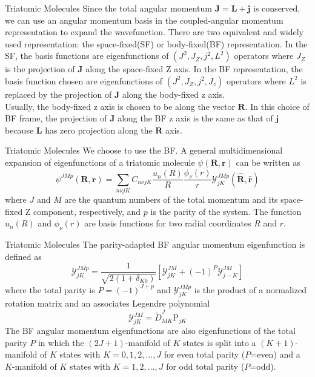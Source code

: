 \documentclass{beamer}
\begin{document}
	\begin{frame}{Triatomic Molecules}
		Since the total angular momentum $\mathbf{J}=\mathbf{L}+\mathbf{j}$ is conserved, we can use an angular momentum basis in the coupled-angular momentum representation to expand the wavefunction. There are two equivalent and widely used representation: the space-fixed(SF) or body-fixed(BF) representation. In the SF, the basis functions are eigenfunctions of $(J^2,J_Z,j^2,L^2)$ operators where $J_Z$ is the projection of $\mathbf{J}$ along the space-fixed Z axis. In the BF representation, the basis function chosen are eigenfunctions of $(J^2,J_Z,j^2,J_z)$ operators where $L^2$ is replaced by the projection of $\mathbf{J}$ along the body-fixed z axis.\\
		Usually, the body-fixed z axis is chosen to be along the vector $\mathbf{R}$. In this choice of BF frame, the projection of $\mathbf{J}$ along the BF z axis is the same as that of $\mathbf{j}$ because $\mathbf{L}$ has zero projection along the $\mathbf{R}$ axis.
	\end{frame}
	\begin{frame}{Triatomic Molecules}
		We choose to use the BF. A general multidimensional expansion of eigenfunctions of a triatomic molecule $\psi(\mathbf{R},\mathbf{r})$ can be written as
		\begin{equation}
			\psi^{JMp}(\mathbf{R},\mathbf{r})=\sum\limits_{n\nu jK}C_{n\nu jK}\dfrac{u_n(R)}{R}\dfrac{\phi_\nu(r)}{r}\mathcal{Y}^{JMp}_{jK}(\hat{\mathbf{R}},\hat{\mathbf{r}})
		\end{equation}
		where $J$ and $M$ are the quantum numbers of the total momentum and its space-fixed Z component, respectively, and $p$ is the parity of the system. The function $u_n(R)$ and $\phi_\nu(r)$ are basis functions for two radial coordinates $R$ and $r$. 
	\end{frame}
	\begin{frame}{Triatomic Molecules}
		The parity-adapted BF angular momentum eigenfunction is defined as
		\begin{equation}
			\mathcal{Y}^{JMp}_{jK}=\dfrac{1}{\sqrt{2(1+\delta_{K0})}}[\mathcal{Y}^{JM}_{jK}+(-1)^P\mathcal{Y}^{JM}_{j-K}]
		\end{equation}
		where the total parity is $P=(-1)^{J+p}$ and $\mathcal{Y}^{JMp}_{jK}$ is the product of a normalized rotation matrix and an associates Legendre polynomial
		\begin{equation}
			\mathcal{Y}^{JM}_{jK}=\tilde{D}^J_{MK}\mathrm{P}_{jK}
		\end{equation}
		The BF angular momentum eigenfunctions are also eigenfunctions of the total parity $P$ in which the $(2J+1)$-manifold of $K$ states is split into a $(K+1)$-manifold of $K$ states with $K=0,1,2,\dots,J$ for even total parity ($P$=even) and a $K$-manifold of $K$ states with $K=1,2,\dots,J$ for odd total parity ($P$=odd).
	\end{frame}
\end{document}
